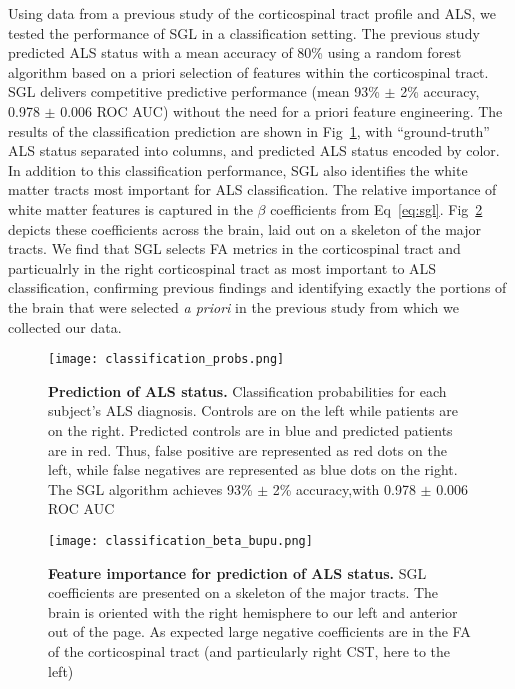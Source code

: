 Using data from a previous study of the corticospinal tract profile and
ALS\cite{sarica2017corticospinal}, we tested the performance of SGL in a
classification setting. The previous study predicted ALS status with a mean
accuracy of 80\% using a random forest algorithm based on a priori selection of
features within the corticospinal tract. SGL delivers competitive predictive
performance (mean 93\% $\pm$ 2\% accuracy, 0.978 $\pm$ 0.006 ROC AUC) without
the need for a priori feature engineering. The results of the classification
prediction are shown in Fig~\ref{fig:class-results}, with ``ground-truth'' ALS
status separated into columns, and predicted ALS status encoded by color. In
addition to this classification performance, SGL also identifies the white
matter tracts most important for ALS classification. The relative importance of
white matter features is captured in the $\beta$ coefficients from
Eq~\eqref{eq:sgl}. Fig~\ref{fig:class-beta} depicts these coefficients across
the brain, laid out on a skeleton of the major tracts. We find that SGL selects
FA metrics in the corticospinal tract and particualrly in the right
corticospinal tract as most important to ALS classification, confirming previous
findings\cite{van2011upper, toosy2003diffusion, sarica2014tractography,
sage2007quantitative, sage2009quantitative, karlsborg2004corticospinal,
ellis1999diffusion, cosottini2005diffusion, ciccarelli2009investigation,
abe2010voxel} and identifying exactly the portions of the brain that were
selected \emph{a priori} in the previous study from which we collected our
data\cite{sarica2017corticospinal}.

\begin{figure}[!h]
    \centering
    \texttt{[image: classification\_probs.png]}
    \caption{{\bf Prediction of ALS status.}
        Classification probabilities for each subject's ALS diagnosis. Controls
        are on the left while patients are on the right. Predicted controls are in blue
        and predicted patients are in red. Thus, false positive are represented as red
        dots on the left, while false negatives are represented as blue dots on the
        right. The SGL algorithm achieves 93\% $\pm$ 2\% accuracy,with 0.978 $\pm$ 0.006
        ROC AUC}
    \label{fig:class-results}
\end{figure}

\begin{figure}[!h]
    \centering
    \texttt{[image: classification\_beta\_bupu.png]}
    \caption{{\bf Feature importance for prediction of ALS status.}
        SGL coefficients are presented on a skeleton of the major tracts. The
    brain is oriented with the right hemisphere to our left and anterior out of
    the page. As expected large negative coefficients are in the FA of the
    corticospinal tract (and particularly right CST, here to the left)}
    \label{fig:class-beta}
\end{figure}


